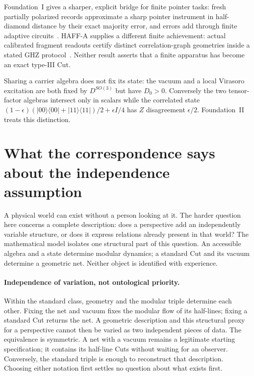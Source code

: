 \documentclass[12pt]{article}
\theoremstyle{definition}
\theoremstyle{remark}
\begin{document}
Foundation~I gives a sharper, explicit bridge for finite pointer tasks:
fresh partially polarized records approximate a sharp pointer instrument in
half-diamond distance by their exact majority error, and errors add through
finite adaptive circuits~\cite{FoundationI}. HAFF-A supplies a different
finite achievement: actual calibrated fragment readouts certify distinct
correlation-graph geometries inside a stated GHZ protocol~\cite{PaperA}.
Neither result asserts that a finite apparatus has become an exact type-III Cut.

Sharing a carrier algebra does not fix its state: the vacuum and a
local Virasoro excitation are both fixed by $D^{SO(3)}$ but have
$D_0>0$. Conversely the two tensor-factor algebras intersect only
in scalars while the correlated state
$(1-\epsilon)(|00\rangle\langle00|+|11\rangle\langle11|)/2+\epsilon I/4$
has $Z$ disagreement $\epsilon/2$. Foundation~II treats this distinction.

\section{What the correspondence says about the independence assumption}\label{sec:hard}

A physical world can exist without a person looking at it. The harder question
here concerns a complete description: does a perspective add an independently
variable structure, or does it express relations already present in that
world? The mathematical model isolates one structural part of this question.
An accessible algebra and a state determine modular dynamics; a standard Cut
and its vacuum determine a geometric net. Neither object is identified with
experience.

\paragraph{Independence of variation, not ontological priority.}
Within the standard class, geometry and the modular triple determine each
other. Fixing the net and vacuum fixes the modular flow of its half-lines;
fixing a standard Cut returns the net. A geometric description and this
structural proxy for a perspective cannot then be varied as two independent
pieces of data. The equivalence is symmetric. A net with a vacuum remains a
legitimate starting specification; it contains its half-line Cuts without
waiting for an observer. Conversely, the standard triple is enough to
reconstruct that description. Choosing either notation first settles no
question about what exists first.
\end{document}
